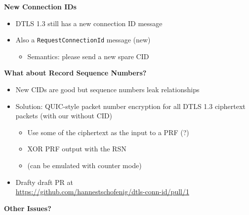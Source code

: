 \documentclass[helvetica]{seminar}
\newcommand{\heading}[1]{%
  \begin{center} 
    \large\bf 
    #1 
  \end{center} 
  \vspace{.4 in}}
\begin{document}
\begin{slide}
  \heading{New Connection IDs}

  \begin{itemize}
  \item DTLS 1.3 still has a new connection ID message
  \item Also a \verb^RequestConnectionId^ message (new)
    \begin{itemize}
    \item Semantics: please send a new spare CID
    \end{itemize}
    
  \end{itemize}

\end{slide}

\begin{slide}
  \heading{What about Record Sequence Numbers?}

  \begin{itemize}
  \item New CIDs are good but sequence numbers leak relationships
  \item Solution: QUIC-style packet number encryption for all DTLS 1.3 ciphertext packets (with our without CID)
    \begin{itemize}
    \item Use some of the ciphertext as the input to a PRF (?)
    \item XOR PRF output with the RSN
    \item (can be emulated with counter mode)      
    \end{itemize}
  \item Drafty draft PR at\\ {\small \url{https://github.com/hannestschofenig/dtls-conn-id/pull/1}}
  \end{itemize}
\end{slide}

\begin{slide}
\heading{Other Issues?}

\end{slide}
\end{document}
